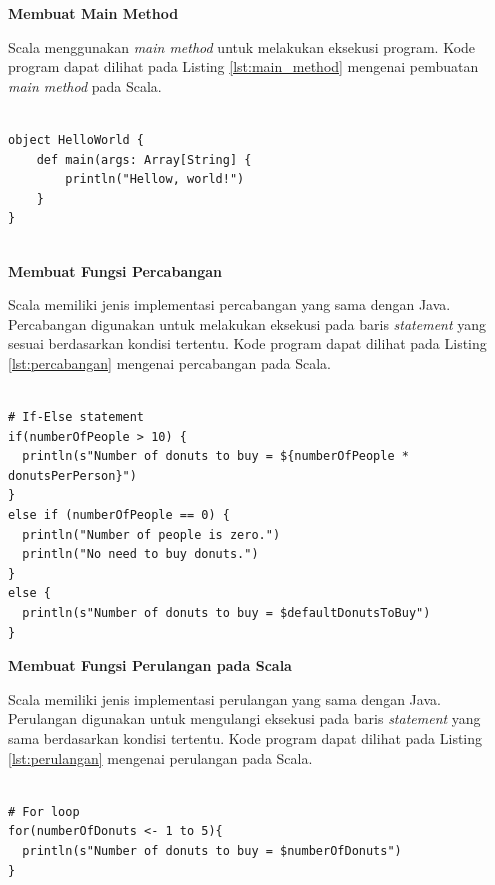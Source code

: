 \documentclass[a4paper,twoside]{article}
\begin{document}
\begin{enumerate}
\textbf{Membuat Main Method}

Scala menggunakan \textit{main method} untuk melakukan eksekusi program. Kode program dapat dilihat pada Listing \ref{lst:main_method} mengenai pembuatan \textit{main method} pada Scala.

\begin{lstlisting}[basicstyle=\ttfamily, frame=single,
	columns=fullflexible, keepspaces=true, breaklines=true, label=lst:main_method, caption=Membuat Main Method pada Scala]
	
object HelloWorld {
	def main(args: Array[String] {
		println("Hellow, world!")
	}
}
	
\end{lstlisting}

\textbf{Membuat Fungsi Percabangan}

Scala memiliki jenis implementasi percabangan yang sama dengan Java. Percabangan digunakan untuk melakukan eksekusi pada baris \textit{statement} yang sesuai berdasarkan kondisi tertentu. Kode program dapat dilihat pada Listing \ref{lst:percabangan} mengenai percabangan pada Scala.

\newpage
\begin{lstlisting}[basicstyle=\ttfamily, frame=single,
	columns=fullflexible, keepspaces=true, breaklines=true, label=lst:percabangan, caption=Membuat Fungsi Percabangan pada Scala]

# If-Else statement
if(numberOfPeople > 10) { 
  println(s"Number of donuts to buy = ${numberOfPeople * donutsPerPerson}")
}
else if (numberOfPeople == 0) {
  println("Number of people is zero.")
  println("No need to buy donuts.")
} 
else {
  println(s"Number of donuts to buy = $defaultDonutsToBuy")
}

\end{lstlisting}

\textbf{Membuat Fungsi Perulangan pada Scala}

Scala memiliki jenis implementasi perulangan yang sama dengan Java. Perulangan digunakan untuk mengulangi eksekusi pada baris \textit{statement} yang sama berdasarkan kondisi tertentu. Kode program dapat dilihat pada Listing \ref{lst:perulangan} mengenai perulangan pada Scala.

\begin{lstlisting}[basicstyle=\ttfamily, frame=single,
	columns=fullflexible, keepspaces=true, breaklines=true, label=lst:perulangan, caption=Membuat Fungsi Perulangan pada Scala]

# For loop
for(numberOfDonuts <- 1 to 5){
  println(s"Number of donuts to buy = $numberOfDonuts")
}


\end{lstlisting}
\end{enumerate}
\end{document}
